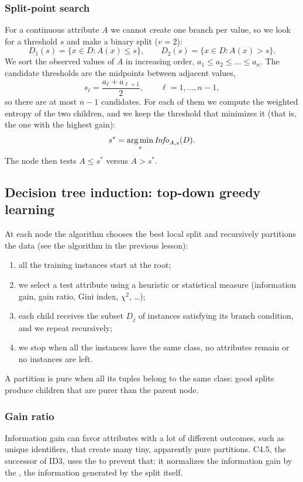 \subsubsection{Split-point search}
For a continuous attribute $A$ we cannot create one branch per value, so we look for a threshold $s$ and make a binary split ($v = 2$):
\[
  D_1(s) = \{x \in D : A(x) \le s\}, \qquad D_2(s) = \{x \in D : A(x) > s\}.
\]
We sort the observed values of $A$ in increasing order, $a_1 \le a_2 \le \dots \le a_n$. The candidate thresholds are the midpoints between adjacent values,
\[
  s_\ell = \frac{a_\ell + a_{\ell+1}}{2}, \qquad \ell = 1,\dots,n-1,
\]
so there are at most $n-1$ candidates. For each of them we compute the weighted entropy of the two children, and we keep the threshold that minimizes it (that is, the one with the highest gain):
\[
  s^* = \operatorname*{arg\,min}_{s} \mathit{Info}_{A,s}(D).
\]
The node then tests $A \le s^*$ versus $A > s^*$.

\subsection{Decision tree induction: top-down greedy learning}

At each node the algorithm chooses the best local split and recursively partitions the data (see the algorithm in the previous lesson):
\begin{enumerate}
  \item all the training instances start at the root;
  \item we select a test attribute using a heuristic or statistical measure (information gain, gain ratio, Gini index, $\chi^2$, \dots);
  \item each child receives the subset $D_j$ of instances satisfying its branch condition, and we repeat recursively;
  \item we stop when all the instances have the same class, no attributes remain or no instances are left.
\end{enumerate}
A partition is pure when all its tuples belong to the same class: good splits produce children that are purer than the parent node.

\subsubsection{Gain ratio}
Information gain can favor attributes with a lot of different outcomes, such as unique identifiers, that create many tiny, apparently pure partitions. C4.5, the successor of ID3, uses the  to prevent that: it normalizes the information gain by the , the information generated by the split itself.

